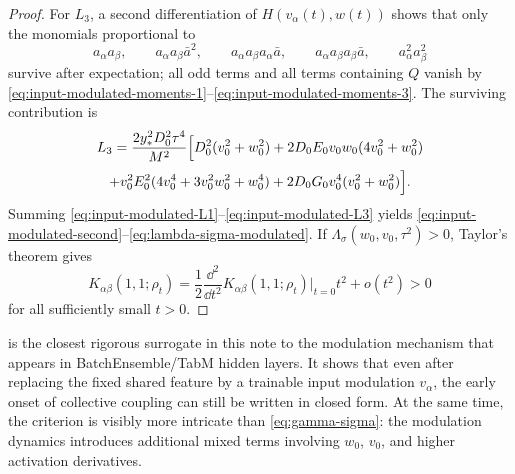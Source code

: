 \begin{proof}
For $L_3$, a second differentiation of $H(v_\alpha(t),w(t))$ shows that only the monomials proportional to
\[
  a_\alpha a_\beta,
  \qquad
  a_\alpha a_\beta \bar a^2,
  \qquad
  a_\alpha a_\beta a_\alpha \bar a,
  \qquad
  a_\alpha a_\beta a_\beta \bar a,
  \qquad
  a_\alpha^2 a_\beta^2
\]
survive after expectation; all odd terms and all terms containing $Q$ vanish by
\eqref{eq:input-modulated-moments-1}--\eqref{eq:input-modulated-moments-3}.
The surviving contribution is
\begin{equation}
  L_3
  =
  \frac{2y_*^2D_0^2\tau^4}{M^2}
  \Bigl[
    D_0^2(v_0^2+w_0^2)
    +
    2D_0E_0v_0w_0(4v_0^2+w_0^2)
  \Bigr.
  \label{eq:input-modulated-L3}
\end{equation}
\[
  \Bigl.
    +
    v_0^2E_0^2(4v_0^4+3v_0^2w_0^2+w_0^4)
    +
    2D_0G_0v_0^4(v_0^2+w_0^2)
  \Bigr].
\]
Summing \eqref{eq:input-modulated-L1}--\eqref{eq:input-modulated-L3} yields
\eqref{eq:input-modulated-second}--\eqref{eq:lambda-sigma-modulated}.
If $\Lambda_\sigma(w_0,v_0,\tau^2)>0$, Taylor's theorem gives
\[
  K_{\alpha\beta}(1,1;\rho_t)
  =
  \frac12
  \frac{\dd^2}{\dd t^2}
  K_{\alpha\beta}(1,1;\rho_t)\Big|_{t=0}
  t^2
  +
  o(t^2)
  >
  0
\]
for all sufficiently small $t>0$.
\end{proof}

\begin{remark}
 is the closest rigorous surrogate in this note to the modulation mechanism that appears in BatchEnsemble/TabM hidden layers.
It shows that even after replacing the fixed shared feature by a trainable input modulation $v_\alpha$,
the early onset of collective coupling can still be written in closed form.
At the same time, the criterion is visibly more intricate than \eqref{eq:gamma-sigma}:
the modulation dynamics introduces additional mixed terms involving $w_0$, $v_0$, and higher activation derivatives.
\end{remark}

